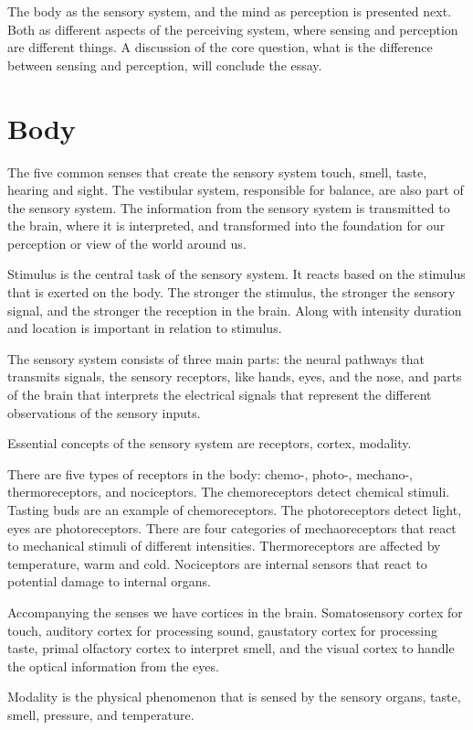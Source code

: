 \documentclass[12pt, a4paper]{article}
\begin{document}
The body as the sensory system, and the mind as perception is presented next. 
Both as different aspects of the perceiving system, where sensing and
perception are different things. A discussion of the core question, what is the
difference between sensing and perception, will conclude the essay. 

\section{Body}
The five common senses that create the sensory system touch, smell, taste,
hearing and sight. The vestibular system, responsible for balance, are also part
of the sensory system. The information from the sensory system is transmitted to
the brain, where it is interpreted, and transformed into the foundation for our
perception or view of the world around us.  

Stimulus is the central task of the sensory system. It reacts based on the
stimulus that is exerted on the body. The stronger the stimulus, the stronger
the sensory signal, and the stronger the reception in the brain. Along with
intensity duration and location is important in relation to stimulus.  

The sensory system consists of three main parts: the neural pathways that
transmits signals, the sensory receptors, like hands, eyes, and the nose, and
parts of the brain that interprets the electrical signals that represent the
different observations of the sensory inputs.

Essential concepts of the sensory system are receptors, cortex, modality. 

There are five types of receptors in the body: chemo-, photo-, mechano-,
thermoreceptors, and nociceptors. The chemoreceptors detect chemical stimuli.
Tasting buds are an example of chemoreceptors. The photoreceptors detect light,
eyes are photoreceptors. There are four categories of mechaoreceptors that
react to mechanical stimuli of different intensities. Thermoreceptors are
affected by temperature, warm and cold. Nociceptors are internal sensors that
react to potential damage to internal organs.  

Accompanying the senses we have cortices in the brain. Somatosensory cortex for
touch, auditory cortex for processing sound, gaustatory cortex for processing
taste, primal olfactory cortex to interpret smell, and the visual cortex to
handle the optical information from the eyes.

Modality is the physical phenomenon that is sensed by the sensory organs,
taste, smell, pressure, and temperature. 
\end{document}
